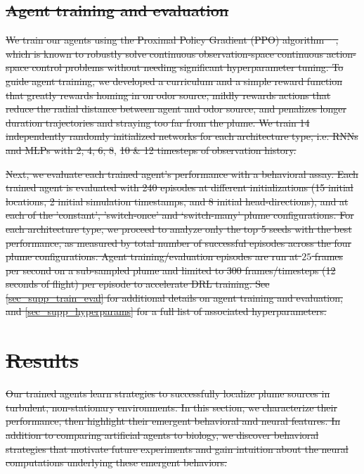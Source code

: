 \documentclass[5p,twocolumn,authoryear]{elsarticle}
\providecommand{\DIFdeltex}[1]{{\protect\color{red}\sout{#1}}}                      %
\providecommand{\DIFdelbegin}{} %
\providecommand{\DIFdelend}{} %
\providecommand{\DIFdel}[1]{\texorpdfstring{\DIFdeltex{#1}}{}} %
\newcommand{\DIFscaledelfig}{0.5}
\newlength{\DIFdelgraphicswidth} %
\newlength{\DIFdelgraphicsheight} %
\newcommand{\DIFdelincludegraphics}[2][]{%
\sbox{\DIFdelgraphicsbox}{\DIFOincludegraphics[#1]{#2}}%
\settoboxwidth{\DIFdelgraphicswidth}{\DIFdelgraphicsbox} %
\settoboxtotalheight{\DIFdelgraphicsheight}{\DIFdelgraphicsbox} %
\scalebox{\DIFscaledelfig}{%
\parbox[b]{\DIFdelgraphicswidth}{\usebox{\DIFdelgraphicsbox}\\[-\baselineskip] \rule{\DIFdelgraphicswidth}{0em}}\llap{\resizebox{\DIFdelgraphicswidth}{\DIFdelgraphicsheight}{%
\setlength{\unitlength}{\DIFdelgraphicswidth}%
\begin{picture}(1,1)%
\thicklines\linethickness{2pt} %
{\color[rgb]{1,0,0}\put(0,0){\framebox(1,1){}}}%
{\color[rgb]{1,0,0}\put(0,0){\line( 1,1){1}}}%
{\color[rgb]{1,0,0}\put(0,1){\line(1,-1){1}}}%
\end{picture}%
}\hspace*{3pt}}} %
} %
\DeclareRobustCommand{\DIFdelbegin}{\DIFOdelbegin \let\includegraphics\DIFdelincludegraphics} %
\DeclareRobustCommand{\DIFdelend}{\DIFOaddend \let\includegraphics\DIFOincludegraphics} %
\begin{document}
\subsection{\DIFdel{Agent training and evaluation}}
\addtocounter{subsection}{-1}%
\DIFdel{We train our agents using the Proximal Policy Gradient (PPO) algorithm  \mbox{%
\citep{schulman2017proximal}}\hspace{0pt}%
, which is known to robustly solve continuous observation-space continuous action-space control problems without needing significant hyperparameter tuning.  
To guide agent training, we developed a curriculum and a simple reward function that greatly rewards homing in on odor source, mildly rewards actions that reduce the radial distance between agent and odor source, and penalizes longer duration trajectories and straying too far from the plume. 
We train 14 independently randomly initialized networks for each architecture type, i.e. RNNs and MLPs with 2, 4, 6, 8}\DIFdelend , \DIFdelbegin \DIFdel{10 \& 12 timesteps of observation history.
}%

\DIFdel{Next, we evaluate each trained agent's performance with a behavioral assay. 
Each trained agent is evaluated with 240 episodes at different initializations (15 initial locations, 2 initial simulation timestamps, and 8 initial head-directions), and at each of the 'constant', 'switch-once' and `switch-many' plume configurations.
For each architecture type, we proceed to analyze only the top 5 seeds with the best performance, as measured by total number of successful episodes across the four plume configurations.
Agent training/evaluation episodes are run at $25$ frames per second on a sub-sampled plume and limited to 300 frames/timesteps (12 seconds of flight) per episode to accelerate DRL training.
See \ref{sec_supp_train_eval} for additional details on agent training and evaluation, and \ref{sec_supp_hyperparams} for a full list of associated hyperparameters.
}%

\section{\DIFdel{Results}}
\addtocounter{section}{-1}%
\DIFdel{Our trained agents learn strategies to successfully localize plume sources in turbulent, non-stationary environments.
In this section, we characterize their performance, then highlight their emergent behavioral and neural features.
In addition to comparing artificial agents to biology, we discover behavioral strategies that motivate future experiments and gain intuition about the neural computations underlying these emergent behaviors.
}%
\end{document}
